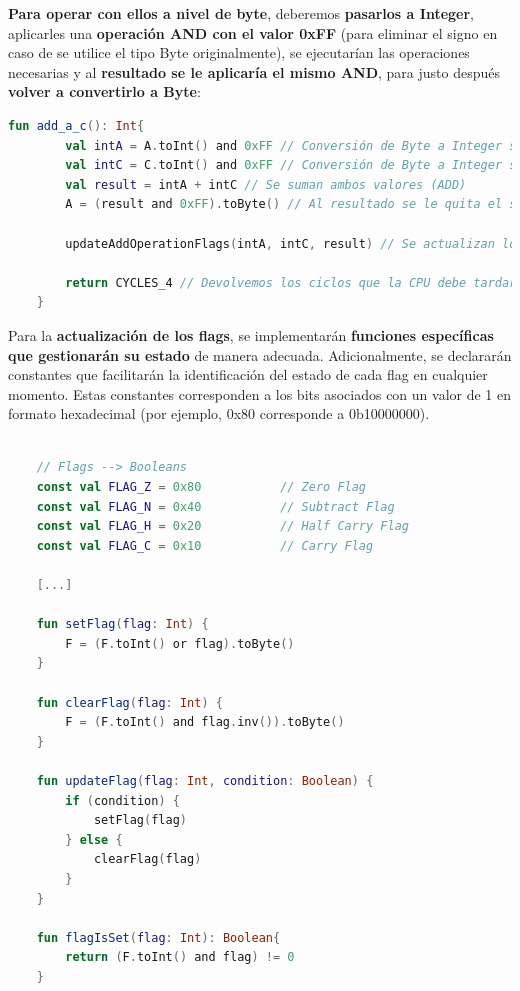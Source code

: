 \textbf{Para operar con ellos a nivel de byte}, deberemos \textbf{pasarlos a Integer}, aplicarles una \textbf{operación AND con el valor 0xFF} (para eliminar el signo en caso de se utilice el tipo Byte originalmente), se ejecutarían las operaciones necesarias y al \textbf{resultado se le aplicaría el mismo AND}, para justo después \textbf{volver a convertirlo a Byte}:

\begin{lstlisting}[language=Kotlin, caption={Ejemplo de Opcode}, label={code:kotlinexample}]
    fun add_a_c(): Int{
        val intA = A.toInt() and 0xFF // Conversión de Byte a Integer sin signo -> A
        val intC = C.toInt() and 0xFF // Conversión de Byte a Integer sin signo -> C
        val result = intA + intC // Se suman ambos valores (ADD)
        A = (result and 0xFF).toByte() // Al resultado se le quita el signo por precaución y se convierte a Byte

        updateAddOperationFlags(intA, intC, result) // Se actualizan los Flags correspondientes

        return CYCLES_4 // Devolvemos los ciclos que la CPU debe tardar en ejecutar la instrucción
    }
\end{lstlisting}

Para la \textbf{actualización de los flags}, se implementarán \textbf{funciones específicas que gestionarán su estado} de manera adecuada. Adicionalmente, se declararán constantes que facilitarán la identificación del estado de cada flag en cualquier momento. Estas constantes corresponden a los bits asociados con un valor de 1 en formato hexadecimal (por ejemplo, 0x80 corresponde a 0b10000000).

\begin{lstlisting}[language=Kotlin, caption={Actualización de Flags}, label={code:kotlinflags}]

    // Flags --> Booleans
    const val FLAG_Z = 0x80           // Zero Flag
    const val FLAG_N = 0x40           // Subtract Flag
    const val FLAG_H = 0x20           // Half Carry Flag
    const val FLAG_C = 0x10           // Carry Flag

    [...]

    fun setFlag(flag: Int) {
        F = (F.toInt() or flag).toByte()
    }

    fun clearFlag(flag: Int) {
        F = (F.toInt() and flag.inv()).toByte()
    }

    fun updateFlag(flag: Int, condition: Boolean) {
        if (condition) {
            setFlag(flag)
        } else {
            clearFlag(flag)
        }
    }

    fun flagIsSet(flag: Int): Boolean{
        return (F.toInt() and flag) != 0
    }
\end{lstlisting}

